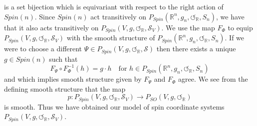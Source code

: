 \documentclass[openany, 11pt]{article}
\theoremstyle{definition}
\theoremstyle{remark}
\def\Sc{\ensuremath{\mathscr{S}}}
\def\cal{\ensuremath{\boldsymbol{\circlearrowleft}}}
\def\bR{\ensuremath{\mathbb{R}}}
\begin{document}
is a set bijection which is equivariant with respect to the right action of $Spin(n)$. Since $Spin(n)$ act transitively on $P_{Spin}(\bR^n,g_n,\cal_{\bR},S_n)$, we have that it also acts transitively on $P_{Spin}(V,g,\cal_{\bR},\Sc_V)$. We use the map $F_{\Phi}$ to equip $P_{Spin}(V,g,\cal_{\bR},\Sc_V)$ with the smooth structure of $P_{Spin}(\bR^n,g_n,\cal_{\bR},S_n)$. If we were to choose a different $\Psi\in P_{Spin}(V,g,\cal_{\bR},\Sc)$ then there exists a unique $g\in Spin(n)$ such that
\[
    F_{\Psi}\circ F_{\Phi}^{-1}(h)=g\cdot h \quad \text{for }h\in P_{Spin}(\bR^n,g_n,\cal_{\bR},S_n)
\]
and which implies smooth structure given by $F_{\Psi}$ and $F_{\Phi}$ agree. We see from the defining smooth structure that the map 
\[
    p:P_{Spin}(V,g,\cal_{\bR},\Sc_V)\rightarrow P_{SO}(V,g,\cal_{\bR})
\]
is smooth. Thus we have obtained our model of spin coordinate systems $P_{Spin}(V,g,\cal_{\bR},\Sc_V)$.
\end{document}
